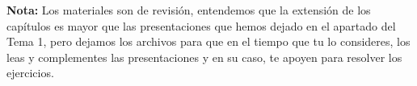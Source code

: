 \par
\textbf{Nota: } Los materiales son de revisión, entendemos que la extensión de los capítulos es mayor que las presentaciones que hemos dejado en el apartado del Tema 1, pero dejamos los archivos para que en el tiempo que tu lo consideres, los leas y complementes las presentaciones y en su caso, te apoyen para resolver los ejercicios.


